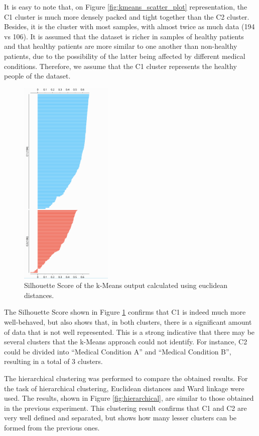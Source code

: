 \documentclass{article}
\begin{document}
It is easy to note that, on Figure \ref{fig:kmeans_scatter_plot} representation, the C1 cluster is much more densely packed and tight together than the C2 cluster. Besides, it is the cluster with most samples, with almost twice as much data (194 vs 106). It is assumed that the dataset is richer in samples of healthy patients and that healthy patients are more similar to one another than non-healthy patients, due to the possibility of the latter being affected by different medical conditions. Therefore, we assume that the C1 cluster represents the healthy people of the dataset.

\begin{figure}[htbp]
    \centering
        \includegraphics[height=10cm]{euclidean_silhouette.png}
    \caption{Silhouette Score of the k-Means output calculated using euclidean distances.}
    \label{fig:silhouette_score}
\end{figure}

The Silhouette Score shown in Figure \ref{fig:silhouette_score} confirms that C1 is indeed much more well-behaved, but also shows that, in both clusters, there is a significant amount of data that is not well represented. This is a strong indicative that there may be several clusters that the k-Means approach could not identify. For instance, C2 could be divided into ``Medical Condition A'' and ``Medical Condition B'', resulting in a total of 3 clusters. 

The hierarchical clustering was performed to compare the obtained results. For the task of hierarchical clustering, Euclidean distances and Ward linkage were used.  The results, shown in Figure \ref{fig:hierarchical}, are similar to those obtained in the previous experiment. This clustering result confirms that C1 and C2 are very well defined and separated, but shows how many lesser clusters can be formed from the previous ones.
\end{document}
